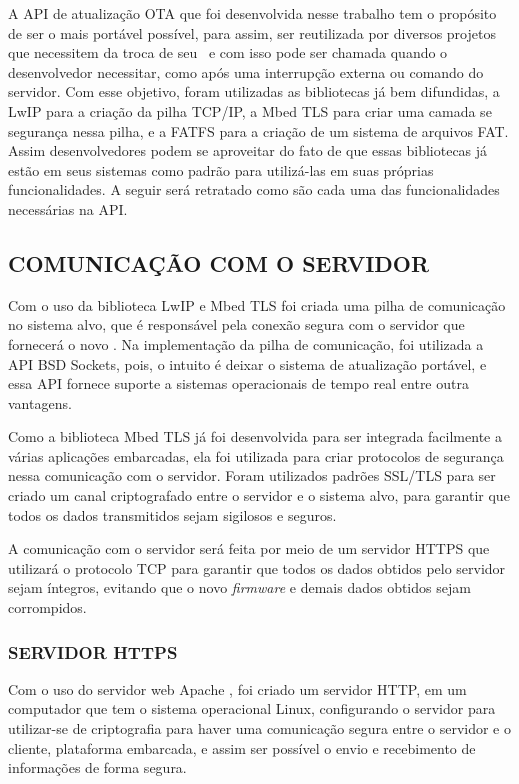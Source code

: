 A API de atualização OTA que foi desenvolvida nesse trabalho tem o propósito de ser o mais portável possível, para assim, ser reutilizada por diversos projetos que necessitem da troca de seu \software\ e com isso pode ser chamada quando o desenvolvedor necessitar, como após uma interrupção externa ou comando do servidor. Com esse objetivo, foram utilizadas as bibliotecas já bem difundidas, a LwIP para a criação da pilha TCP/IP, a Mbed TLS para criar uma camada se segurança nessa pilha, e a FATFS para a criação de um sistema de arquivos FAT. Assim desenvolvedores podem se aproveitar do fato de que essas bibliotecas já estão em seus sistemas como padrão para utilizá-las em suas próprias funcionalidades. 
A seguir será retratado como são cada uma das funcionalidades necessárias na API.


\subsection{COMUNICAÇÃO COM O SERVIDOR}

Com o uso da biblioteca LwIP e Mbed TLS foi criada uma pilha de comunicação no sistema alvo, que é responsável pela conexão segura com o servidor que fornecerá o novo \firmware. Na implementação da pilha de comunicação, foi utilizada a API BSD Sockets, pois, o intuito é deixar o sistema de atualização portável, e essa API fornece suporte a sistemas operacionais de tempo real entre outra vantagens.

Como a biblioteca Mbed TLS já foi desenvolvida para ser integrada facilmente a várias aplicações embarcadas, ela foi utilizada para criar protocolos de segurança nessa comunicação com o servidor. Foram utilizados padrões SSL/TLS para ser criado um canal criptografado entre o servidor e o sistema alvo, para garantir que todos os dados transmitidos sejam sigilosos e seguros.

A comunicação com o servidor será feita por meio de um servidor HTTPS que utilizará o protocolo TCP para garantir que todos os dados obtidos pelo servidor sejam íntegros, evitando que o novo \textit{firmware} e demais dados obtidos sejam corrompidos. 

\subsubsection{SERVIDOR HTTPS}
Com o uso do servidor web Apache \cite{Apache}, foi criado um servidor HTTP, em um computador que tem o sistema operacional Linux, configurando o servidor para utilizar-se de criptografia para haver uma comunicação segura entre o servidor e o cliente, plataforma embarcada, e assim ser possível o envio e recebimento de informações de forma segura. 

